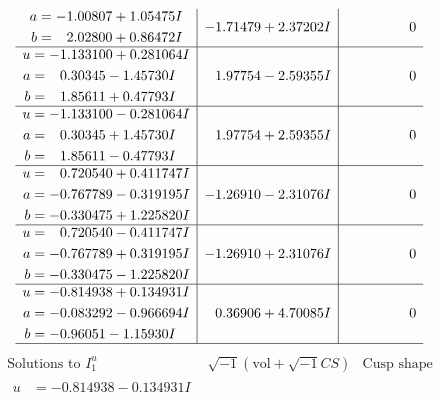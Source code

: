\documentclass[1p]{elsarticle_modified}
\theoremstyle{definition}
\newcommand{\I}{\sqrt{-1}}
\begin{document}
$$\begin{array}{c|c|c}
\begin{aligned}
a &= -1.00807 + 1.05475 I \\
b &= \phantom{-}2.02800 + 0.86472 I\end{aligned}
 & -1.71479 + 2.37202 I & \phantom{-0.000000 } 0 \\ \hline\begin{aligned}
u &= -1.133100 + 0.281064 I \\
a &= \phantom{-}0.30345 - 1.45730 I \\
b &= \phantom{-}1.85611 + 0.47793 I\end{aligned}
 & \phantom{-}1.97754 - 2.59355 I & \phantom{-0.000000 } 0 \\ \hline\begin{aligned}
u &= -1.133100 - 0.281064 I \\
a &= \phantom{-}0.30345 + 1.45730 I \\
b &= \phantom{-}1.85611 - 0.47793 I\end{aligned}
 & \phantom{-}1.97754 + 2.59355 I & \phantom{-0.000000 } 0 \\ \hline\begin{aligned}
u &= \phantom{-}0.720540 + 0.411747 I \\
a &= -0.767789 - 0.319195 I \\
b &= -0.330475 + 1.225820 I\end{aligned}
 & -1.26910 - 2.31076 I & \phantom{-0.000000 } 0 \\ \hline\begin{aligned}
u &= \phantom{-}0.720540 - 0.411747 I \\
a &= -0.767789 + 0.319195 I \\
b &= -0.330475 - 1.225820 I\end{aligned}
 & -1.26910 + 2.31076 I & \phantom{-0.000000 } 0 \\ \hline\begin{aligned}
u &= -0.814938 + 0.134931 I \\
a &= -0.083292 - 0.966694 I \\
b &= -0.96051 - 1.15930 I\end{aligned}
 & \phantom{-}0.36906 + 4.70085 I & \phantom{-0.000000 } 0\\
 \hline 
 \end{array}$$\newpage$$\begin{array}{c|c|c}  
\text{Solutions to }I^u_{1}& \I (\text{vol} + \sqrt{-1}CS) & \text{Cusp shape}\\
 \hline 
\begin{aligned}
u &= -0.814938 - 0.134931 I \\

\end{aligned}
\end{array}$$
\end{document}
